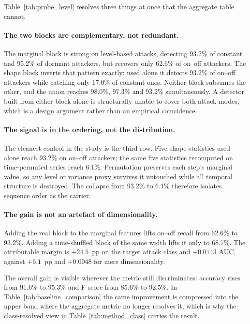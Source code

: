 \documentclass[notspecified,article,submit,moreauthors]{Definitions/mdpi}
\begin{document}
Table~\ref{tab:probe_level} resolves three things at once that the aggregate table cannot.

\paragraph{The two blocks are complementary, not redundant.} The marginal block is strong on level-based attacks, detecting 93.2\% of constant and 95.2\% of dormant attackers, but recovers only 62.6\% of on--off attackers. The shape block inverts that pattern exactly: used alone it detects 93.2\% of on--off attackers while catching only 17.0\% of constant ones. Neither block subsumes the other, and the union reaches 98.0\%, 97.3\% and 93.2\% simultaneously. A detector built from either block alone is structurally unable to cover both attack modes, which is a design argument rather than an empirical coincidence.

\paragraph{The signal is in the ordering, not the distribution.} The cleanest control in the study is the third row. Five shape statistics used alone reach 93.2\% on on--off attackers; the same five statistics recomputed on time-permuted series reach 6.1\%. Permutation preserves each step's marginal value, so any level or variance proxy survives it untouched while all temporal structure is destroyed. The collapse from 93.2\% to 6.1\% therefore isolates sequence order as the carrier.

\paragraph{The gain is not an artefact of dimensionality.} Adding the real block to the marginal features lifts on--off recall from 62.6\% to 93.2\%. Adding a time-shuffled block of the same width lifts it only to 68.7\%. The attributable margin is $+24.5$~pp on the target attack class and $+0.0143$ AUC, against $+6.1$~pp and $+0.0048$ for mere dimensionality.

The overall gain is visible wherever the metric still discriminates: accuracy rises from 91.6\% to 95.3\% and F-score from 85.6\% to 92.5\%. In Table~\ref{tab:baseline_comparison} the same improvement is compressed into the upper band where the aggregate metric no longer resolves it, which is why the class-resolved view in Table~\ref{tab:method_class} carries the result.
\end{document}
